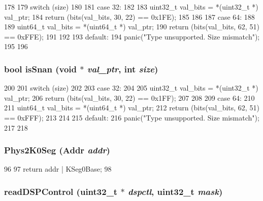 \begin{DoxyCode}
178 {
179     switch (size)
180     {
181       case 32:
182         {
183             uint32_t val_bits = *(uint32_t *) val_ptr;
184             return (bits(val_bits, 30, 22) == 0x1FE);
185         }
186 
187       case 64:
188         {
189             uint64_t val_bits = *(uint64_t *) val_ptr;
190             return (bits(val_bits, 62, 51) == 0xFFE);
191         }
192 
193       default:
194         panic("Type unsupported. Size mismatch\n");
195     }
196 }
\end{DoxyCode}
\hypertarget{namespaceMipsISA_a688fdecf4f2d2faf933cb4085c72c003}{
\subsubsection[{isSnan}]{\setlength{\rightskip}{0pt plus 5cm}bool isSnan (void $\ast$ {\em val\_\-ptr}, \/  int {\em size})}}
\label{namespaceMipsISA_a688fdecf4f2d2faf933cb4085c72c003}



\begin{DoxyCode}
200 {
201     switch (size)
202     {
203       case 32:
204         {
205             uint32_t val_bits = *(uint32_t *) val_ptr;
206             return (bits(val_bits, 30, 22) == 0x1FF);
207         }
208 
209       case 64:
210         {
211             uint64_t val_bits = *(uint64_t *) val_ptr;
212             return (bits(val_bits, 62, 51) == 0xFFF);
213         }
214 
215       default:
216         panic("Type unsupported. Size mismatch\n");
217     }
218 }
\end{DoxyCode}
\hypertarget{namespaceMipsISA_af5384b2f3700f6a096ef6b0ccb6dfe89}{
\subsubsection[{Phys2K0Seg}]{ Phys2K0Seg ({\bf Addr} {\em addr})}}
\label{namespaceMipsISA_af5384b2f3700f6a096ef6b0ccb6dfe89}



\begin{DoxyCode}
96 {
97     return addr | KSeg0Base;
98 }
\end{DoxyCode}
\hypertarget{namespaceMipsISA_a7c5243738a02678e025034797a57ff7d}{
\subsubsection[{readDSPControl}]{ readDSPControl ({\bf uint32\_\-t} $\ast$ {\em dspctl}, \/  {\bf uint32\_\-t} {\em mask})}}
\label{namespaceMipsISA_a7c5243738a02678e025034797a57ff7d}



